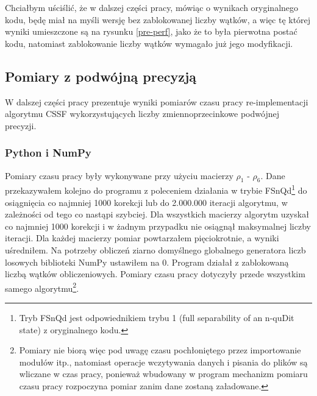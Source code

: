 \documentclass[11pt, a4paper]{article}
\begin{document}
\begin{sloppypar}
    Chciałbym uściślić, że w dalszej części pracy, mówiąc o wynikach oryginalnego kodu,
    będę miał na myśli wersję bez zablokowanej liczby wątków, a więc tę której wyniki umieszczone
    są na rysunku \ref{pre-perf}, jako że to była pierwotna postać kodu, natomiast zablokowanie
    liczby wątków wymagało już jego modyfikacji.

    \subsection{Pomiary z podwójną precyzją}
    \label{plots-double-precision} W dalszej części pracy prezentuje wyniki pomiarów czasu
    pracy re-implementacji algorytmu CSSF wykorzystujących liczby zmiennoprzecinkowe podwójnej
    precyzji.

    \subsubsection{ Python i NumPy }
    Pomiary czasu pracy były wykonywane przy użyciu macierzy $\rho_{1}$ - $\rho_{6}$.
    Dane przekazywałem kolejno do programu z poleceniem działania w trybie FSnQd\footnote{Tryb
    FSnQd jest odpowiednikiem trybu 1 (full separability of an n-quDit state) z oryginalnego
    kodu.} do osiągnięcia co najmniej 1000 korekcji lub do 2.000.000 iteracji algorytmu,
    w zależności od tego co nastąpi szybciej. Dla wszystkich macierzy algorytm uzyskał
    co najmniej 1000 korekcji i w żadnym przypadku nie osiągnął maksymalnej liczby
    iteracji. Dla każdej macierzy pomiar powtarzałem pięciokrotnie, a wyniki uśredniłem.
    Na potrzeby obliczeń ziarno domyślnego globalnego generatora liczb losowych biblioteki
    NumPy ustawiłem na 0. Program działał z zablokowaną liczbą wątków obliczeniowych.
    Pomiary czasu pracy dotyczyły przede wszystkim samego algorytmu\footnote{Pomiary nie
    biorą więc pod uwagę czasu pochłoniętego przez importowanie modułów itp., natomiast operacje
    wczytywania danych i pisania do plików są wliczane w czas pracy, ponieważ wbudowany
    w program mechanizm pomiaru czasu pracy rozpoczyna pomiar zanim dane zostaną
    załadowane.}.


\end{sloppypar}
\end{document}

